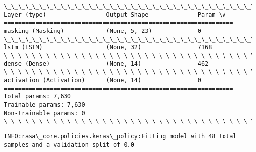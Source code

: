 \documentclass[11pt]{article}
\begin{document}
    \begin{Verbatim}[commandchars=\\\{\}]
\_\_\_\_\_\_\_\_\_\_\_\_\_\_\_\_\_\_\_\_\_\_\_\_\_\_\_\_\_\_\_\_\_\_\_\_\_\_\_\_\_\_\_\_\_\_\_\_\_\_\_\_\_\_\_\_\_\_\_\_\_\_\_\_\_
Layer (type)                 Output Shape              Param \#   
=================================================================
masking (Masking)            (None, 5, 23)             0         
\_\_\_\_\_\_\_\_\_\_\_\_\_\_\_\_\_\_\_\_\_\_\_\_\_\_\_\_\_\_\_\_\_\_\_\_\_\_\_\_\_\_\_\_\_\_\_\_\_\_\_\_\_\_\_\_\_\_\_\_\_\_\_\_\_
lstm (LSTM)                  (None, 32)                7168      
\_\_\_\_\_\_\_\_\_\_\_\_\_\_\_\_\_\_\_\_\_\_\_\_\_\_\_\_\_\_\_\_\_\_\_\_\_\_\_\_\_\_\_\_\_\_\_\_\_\_\_\_\_\_\_\_\_\_\_\_\_\_\_\_\_
dense (Dense)                (None, 14)                462       
\_\_\_\_\_\_\_\_\_\_\_\_\_\_\_\_\_\_\_\_\_\_\_\_\_\_\_\_\_\_\_\_\_\_\_\_\_\_\_\_\_\_\_\_\_\_\_\_\_\_\_\_\_\_\_\_\_\_\_\_\_\_\_\_\_
activation (Activation)      (None, 14)                0         
=================================================================
Total params: 7,630
Trainable params: 7,630
Non-trainable params: 0
\_\_\_\_\_\_\_\_\_\_\_\_\_\_\_\_\_\_\_\_\_\_\_\_\_\_\_\_\_\_\_\_\_\_\_\_\_\_\_\_\_\_\_\_\_\_\_\_\_\_\_\_\_\_\_\_\_\_\_\_\_\_\_\_\_

    \end{Verbatim}

    \begin{Verbatim}[commandchars=\\\{\}]
INFO:rasa\_core.policies.keras\_policy:Fitting model with 48 total samples and a validation split of 0.0

    \end{Verbatim}
\end{document}
